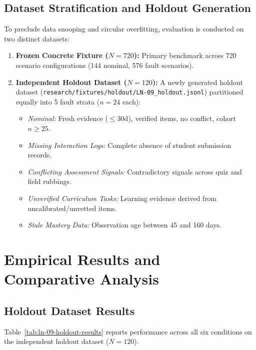 \documentclass[11pt,a4paper]{article}
\begin{document}
\subsection{Dataset Stratification and Holdout Generation}
To preclude data snooping and circular overfitting, evaluation is conducted on two distinct datasets:
\begin{enumerate}
    \item \textbf{Frozen Concrete Fixture ($N=720$):} Primary benchmark across 720 scenario configurations (144 nominal, 576 fault scenarios).
    \item \textbf{Independent Holdout Dataset ($N=120$):} A newly generated holdout dataset (\texttt{research/fixtures/holdout/LN-09\_holdout.jsonl}) partitioned equally into 5 fault strata ($n=24$ each):
    \begin{itemize}
        \item \textit{Nominal:} Fresh evidence ($\le 30$d), verified items, no conflict, cohort $n \ge 25$.
        \item \textit{Missing Interaction Logs:} Complete absence of student submission records.
        \item \textit{Conflicting Assessment Signals:} Contradictory signals across quiz and field rubbings.
        \item \textit{Unverified Curriculum Tasks:} Learning evidence derived from uncalibrated/unvetted items.
        \item \textit{Stale Mastery Data:} Observation age between 45 and 160 days.
    \end{itemize}
\end{enumerate}

\section{Empirical Results and Comparative Analysis}

\subsection{Holdout Dataset Results}
Table~\ref{tab:ln-09-holdout-results} reports performance across all six conditions on the independent holdout dataset ($N=120$).


\end{document}
